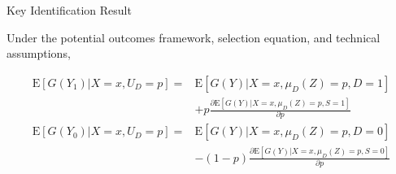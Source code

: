 \documentclass{beamer}
\newcommand{\E}{\mathrm{E}} %
\begin{document}
\begin{frame}[shrink = 1]{Key Identification Result}

\begin{theorem}
  Under the potential outcomes framework, selection equation, and
  technical assumptions,

\vspace{-.25cm}
\begin{align*}
  \E\left[ G(Y_1) | X = x, U_D = p \right] = &\E \left[ G(Y) | X = x, \mu_D(Z) = p, D = 1 \right] \\
  &+ p \frac{\partial \E\left[ G(Y) | X = x, \mu_D(Z) = p, S = 1 \right]}{\partial p} \\
  \E\left[ G(Y_0) | X = x, U_D = p \right] = &\E \left[ G(Y) | X = x, \mu_D(Z) = p, D = 0 \right] \\
  &- (1 - p) \frac{\partial \E\left[ G(Y) | X = x, \mu_D(Z) = p, S = 0 \right]}{\partial p} \\
\end{align*}
\end{theorem}

\end{frame}
\end{document}
